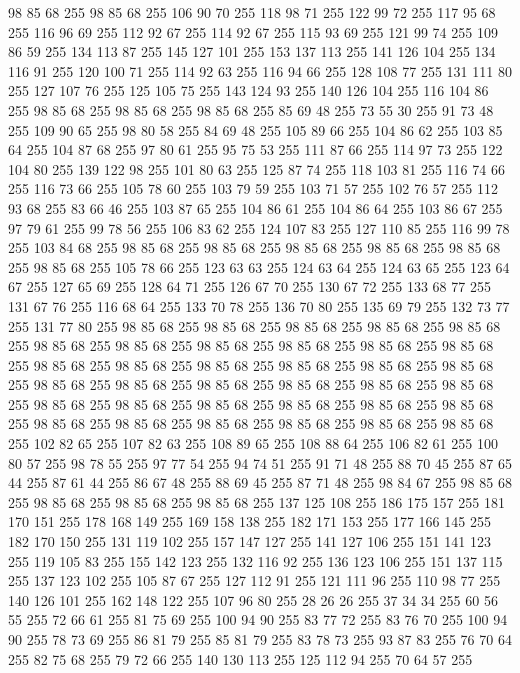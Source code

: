 98 85 68 255 98 85 68 255 106 90 70 255 118 98 71 255 122 99 72 255 117 95 68 255 116 96 69 255 112 92 67 255 114 92 67 255 115 93 69 255 121 99 74 255 109 86 59 255 134 113 87 255 145 127 101 255 153 137 113 255 141 126 104 255 134 116 91 255 120 100 71 255 114 92 63 255 116 94 66 255 128 108 77 255 131 111 80 255 127 107 76 255 125 105 75 255 143 124 93 255 140 126 104 255 116 104 86 255 98 85 68 255 98 85 68 255 98 85 68 255 85 69 48 255 73 55 30 255 91 73 48 255 109 90 65 255 98 80 58 255 84 69 48 255 105 89 66 255 104 86 62 255 103 85 64 255 104 87 68 255 97 80 61 255 95 75 53 255 111 87 66 255 114 97 73 255 122 104 80 255 139 122 98 255 101 80 63 255 125 87 74 255 118 103 81 255 116 74 66 255 116 73 66 255 105 78 60 255 103 79 59 255 103 71 57 255 102 76 57 255 112 93 68 255 83 66 46 255 103 87 65 255 104 86 61 255 104 86 64 255 103 86 67 255 97 79 61 255 99 78 56 255 106 83 62 255
124 107 83 255 127 110 85 255 116 99 78 255 103 84 68 255 98 85 68 255 98 85 68 255 98 85 68 255 98 85 68 255 98 85 68 255 98 85 68 255 105 78 66 255 123 63 63 255 124 63 64 255 124 63 65 255 123 64 67 255 127 65 69 255 128 64 71 255 126 67 70 255 130 67 72 255 133 68 77 255 131 67 76 255 116 68 64 255 133 70 78 255 136 70 80 255 135 69 79 255 132 73 77 255 131 77 80 255 98 85 68 255 98 85 68 255 98 85 68 255 98 85 68 255 98 85 68 255 98 85 68 255 98 85 68 255 98 85 68 255 98 85 68 255 98 85 68 255 98 85 68 255 98 85 68 255 98 85 68 255 98 85 68 255 98 85 68 255 98 85 68 255 98 85 68 255 98 85 68 255 98 85 68 255 98 85 68 255 98 85 68 255 98 85 68 255 98 85 68 255 98 85 68 255 98 85 68 255 98 85 68 255 98 85 68 255 98 85 68 255 98 85 68 255 98 85 68 255 98 85 68 255 98 85 68 255 98 85 68 255 98 85 68 255 98 85 68 255 102 82 65 255 107 82 63 255
108 89 65 255 108 88 64 255 106 82 61 255 100 80 57 255 98 78 55 255 97 77 54 255 94 74 51 255 91 71 48 255 88 70 45 255 87 65 44 255 87 61 44 255 86 67 48 255 88 69 45 255 87 71 48 255 98 84 67 255 98 85 68 255 98 85 68 255 98 85 68 255 98 85 68 255 137 125 108 255 186 175 157 255 181 170 151 255 178 168 149 255 169 158 138 255 182 171 153 255 177 166 145 255 182 170 150 255 131 119 102 255 157 147 127 255 141 127 106 255 151 141 123 255 119 105 83 255 155 142 123 255 132 116 92 255 136 123 106 255 151 137 115 255 137 123 102 255 105 87 67 255 127 112 91 255 121 111 96 255 110 98 77 255 140 126 101 255 162 148 122 255 107 96 80 255 28 26 26 255 37 34 34 255 60 56 55 255 72 66 61 255 81 75 69 255 100 94 90 255 83 77 72 255 83 76 70 255 100 94 90 255 78 73 69 255 86 81 79 255 85 81 79 255 83 78 73 255 93 87 83 255 76 70 64 255 82 75 68 255 79 72 66 255 140 130 113 255 125 112 94 255 70 64 57 255
